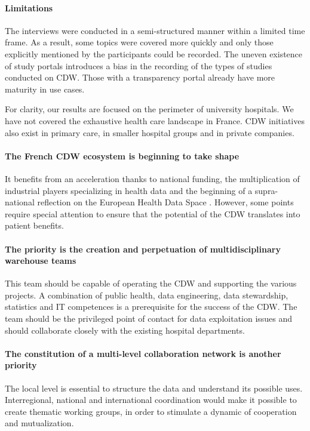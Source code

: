 \documentclass[french,12pt,twoside,a4paper]{book}
\begin{document}
\paragraph{Limitations}

The interviews were conducted in a semi-structured manner within a limited time
frame. As a result, some topics were covered more quickly and only those
explicitly mentioned by the participants could be recorded. The uneven existence
of study portals introduces a bias in the recording of the types of studies
conducted on CDW. Those with a transparency portal already have more maturity in
use cases.

For clarity, our results are focused on the perimeter of university hospitals.
We have not covered the exhaustive health care landscape in France. CDW
initiatives also exist in primary care, in smaller hospital groups and in
private companies.

\paragraph{The French CDW ecosystem is beginning to take shape} It benefits from
an acceleration thanks to national funding, the multiplication of industrial
players specializing in health data and the beginning of a supra-national
reflection on the European Health Data Space \citep{ehds_2022}. However, some
points require special attention to ensure that the potential of the CDW
translates into patient benefits.

\paragraph{The priority is the creation and perpetuation of multidisciplinary
  warehouse teams} This team should be capable of operating the CDW and supporting the various
projects. A combination of public health, data engineering, data stewardship,
statistics and IT competences is a prerequisite for the success of the CDW. The
team should be the privileged point of contact for data exploitation issues and
should collaborate closely with the existing hospital departments.

\paragraph{The constitution of a multi-level collaboration network is another
  priority} The local level is essential to structure the data and understand its
possible uses. Interregional, national and international coordination would make
it possible to create thematic working groups, in order to stimulate a dynamic
of cooperation and mutualization.
\end{document}
